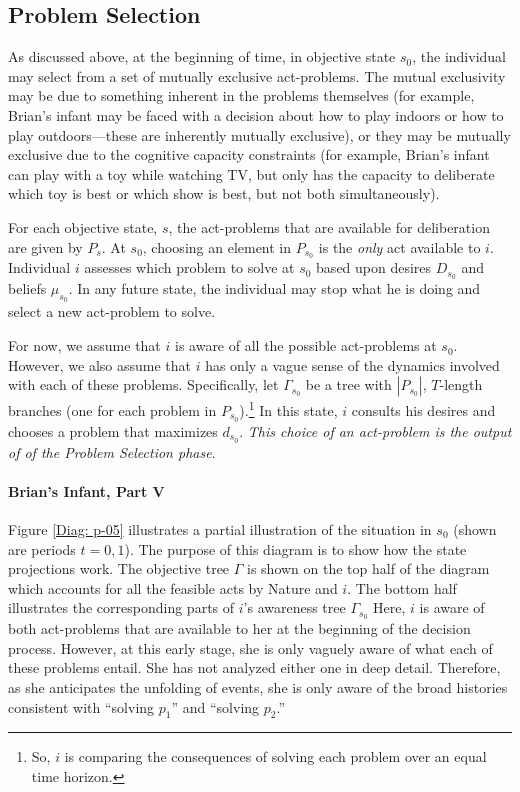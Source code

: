 \documentclass[
11pt,
titlepage,
reqno,
]{article}%
\theoremstyle{definition}
\begin{document}
\subsection{Problem Selection}

As discussed above, at the beginning of time, in objective state $s_0$, the individual may select from a set of mutually exclusive act-problems. 
The mutual exclusivity may be due to something inherent in the problems themselves (for example, Brian's infant may be faced with a decision about how to play indoors or how to play outdoors---these are inherently mutually exclusive), or they may be mutually exclusive due to the cognitive capacity constraints (for example, Brian's infant can play with a toy while watching TV, but only has the capacity to deliberate which toy is best or which show is best, but not both simultaneously).

For each objective state, $s$, the act-problems that are available for deliberation are given by $P_s$.
At $s_0$, choosing an element in $P_{s_0}$ is the \textit{only} act available to $i$.
Individual $i$ assesses which problem to solve at $s_0$ based upon desires $D_{s_0}$ and beliefs $\mu_{s_0}$.
In any future state, the individual may stop what he is doing and select a new act-problem to solve.

For now, we assume that $i$ is aware of all the possible act-problems at $s_0$.
However, we also assume that $i$ has only a vague sense of the dynamics involved with each of these problems.
Specifically, let $\Gamma_{s_0}$ be a tree with $|P_{s_0}|$, $T$-length branches (one for each problem in $P_{s_0}$).\footnote
{
	So, $i$ is comparing the consequences of solving each problem over an equal time horizon.
}
In this state, $i$ consults his desires and chooses a problem that maximizes $d_{s_0}$.
\textit{This choice of an act-problem is the output of of the Problem Selection phase}.

\paragraph{Brian's Infant, Part V}
Figure \ref{Diag: p-05} illustrates  a partial illustration of the situation in $s_0$ (shown are periods $t=0,1$).
The purpose of this diagram is to show how the state projections work.
The objective tree $\Gamma$ is shown on the top half of the diagram which accounts for all the feasible acts by Nature and $i$.
The bottom half illustrates the corresponding parts of $i$'s awareness tree $\Gamma_{s_0}$
Here, $i$ is aware of both act-problems that are available to her at the beginning of the decision process.
However, at this early stage, she is only vaguely aware of what each of these problems entail.
She has not analyzed either one in deep detail.
Therefore, as she anticipates the unfolding of events, she is only aware of the broad histories consistent with ``solving $p_1$'' and ``solving $p_2$.''
\end{document}
